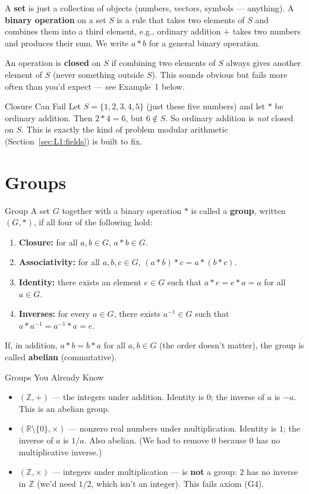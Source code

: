 A \textbf{set} is just a collection of objects (numbers, vectors, symbols --- anything). A \textbf{binary operation} on a set $S$ is a rule that takes two elements of $S$ and combines them into a third element, e.g., ordinary addition $+$ takes two numbers and produces their sum. We write $a * b$ for a general binary operation.

An operation is \textbf{closed} on $S$ if combining two elements of $S$ always gives another element of $S$ (never something outside $S$). This sounds obvious but fails more often than you'd expect --- see Example~1 below.

\begin{exbox}{Closure Can Fail}
Let $S = \{1, 2, 3, 4, 5\}$ (just these five numbers) and let $*$ be ordinary addition. Then $2 * 4 = 6$, but $6 \notin S$. So ordinary addition is \emph{not} closed on $S$. This is exactly the kind of problem modular arithmetic (Section~\ref{sec:L1:fields}) is built to fix.
\end{exbox}

\section{Groups}
\label{sec:L1:groups}

\begin{defbox}{Group}
A set $G$ together with a binary operation $*$ is called a \textbf{group}, written $(G, *)$, if all four of the following hold:
\begin{enumerate}[leftmargin=*, label=(G\arabic*)]
  \item \textbf{Closure:} for all $a, b \in G$, $a * b \in G$.
  \item \textbf{Associativity:} for all $a,b,c \in G$, $(a*b)*c = a*(b*c)$.
  \item \textbf{Identity:} there exists an element $e \in G$ such that $a * e = e * a = a$ for all $a \in G$.
  \item \textbf{Inverses:} for every $a \in G$, there exists $a^{-1} \in G$ such that $a * a^{-1} = a^{-1} * a = e$.
\end{enumerate}
If, in addition, $a * b = b * a$ for all $a, b \in G$ (the order doesn't matter), the group is called \textbf{abelian} (commutative).
\end{defbox}

\begin{exbox}{Groups You Already Know}
\begin{itemize}[leftmargin=*]
  \item $(\mathbb{Z}, +)$ --- the integers under addition. Identity is $0$; the inverse of $a$ is $-a$. This is an abelian group.
  \item $(\mathbb{R} \setminus \{0\}, \times)$ --- nonzero real numbers under multiplication. Identity is $1$; the inverse of $a$ is $1/a$. Also abelian. (We had to remove $0$ because $0$ has no multiplicative inverse.)
  \item $(\mathbb{Z}, \times)$ --- integers under multiplication --- is \textbf{not} a group: $2$ has no inverse in $\mathbb{Z}$ (we'd need $1/2$, which isn't an integer). This fails axiom (G4).
\end{itemize}
\end{exbox}

